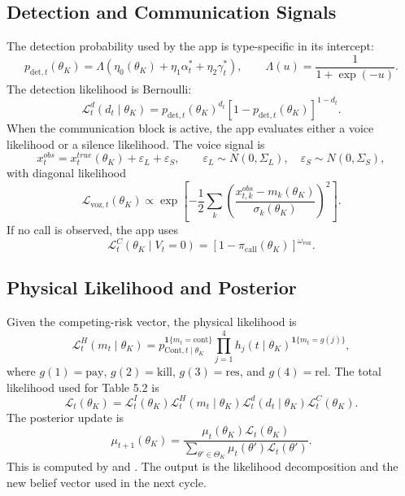 \documentclass[ecta,nameyear,final,supplement]{econsocart}
\numberwithin{equation}{section}
\newcommand{\Ind}{\mathbf{1}}
\newcommand{\ThetaK}{\Theta_K}
\newcommand{\thetak}{\theta_K}
\newcommand{\LH}{\mathcal{L}^{H}}
\newcommand{\LD}{\mathcal{L}^{d}}
\newcommand{\LC}{\mathcal{L}^{C}}
\newcommand{\LI}{\mathcal{L}^{I}}
\newcommand{\LT}{\mathcal{L}}
\begin{document}
\subsection{Detection and Communication Signals}

The detection probability used by the app is type-specific in its intercept:
\begin{equation}
p_{\mathrm{det},t}(\thetak)
=
\Lambda\!\left(\eta_0(\thetak)+\eta_1\alpha_t^\ast+\eta_2\gamma_t^\ast\right),
\qquad
\Lambda(u)=\frac{1}{1+\exp(-u)}.
\label{eq:app-detection}
\end{equation}
The detection likelihood is Bernoulli:
\begin{equation}
\LD_t(d_t\mid\thetak)
=
p_{\mathrm{det},t}(\thetak)^{d_t}
\left[1-p_{\mathrm{det},t}(\thetak)\right]^{1-d_t}.
\label{eq:app-ld}
\end{equation}
When the communication block is active, the app evaluates either a voice
likelihood or a silence likelihood. The voice signal is
\begin{equation}
x_t^{obs}
=
x_t^{true}(\thetak)+\varepsilon_L+\varepsilon_S,
\qquad
\varepsilon_L\sim N(0,\Sigma_L),\quad
\varepsilon_S\sim N(0,\Sigma_S),
\label{eq:app-voice}
\end{equation}
with diagonal likelihood
\begin{equation}
\mathcal L_{\mathrm{voz},t}(\thetak)
\propto
\exp\!\left[-\frac12
\sum_k
\left(\frac{x_{t,k}^{obs}-m_k(\thetak)}{\sigma_k(\thetak)}\right)^2
\right].
\label{eq:app-voice-likelihood}
\end{equation}
If no call is observed, the app uses
\begin{equation}
\LC_t(\thetak\mid V_t=0)
=
\left[1-\pi_{\mathrm{call}}(\thetak)\right]^{\omega_{\mathrm{voz}}}.
\label{eq:app-silence}
\end{equation}

\subsection{Physical Likelihood and Posterior}

Given the competing-risk vector, the physical likelihood is
\begin{equation}
\LH_t(m_t\mid\thetak)
=
p_{\mathrm{Cont},t\mid\thetak}^{\Ind\{m_t=\mathrm{cont}\}}
\prod_{j=1}^{4}
h_j(t\mid\thetak)^{\Ind\{m_t=g(j)\}},
\label{eq:app-lh}
\end{equation}
where $g(1)=\mathrm{pay}$, $g(2)=\mathrm{kill}$,
$g(3)=\mathrm{res}$, and $g(4)=\mathrm{rel}$. The total likelihood used for
Table 5.2 is
\begin{equation}
\LT_t(\thetak)
=
\LI_t(\thetak)\LH_t(m_t\mid\thetak)
\LD_t(d_t\mid\thetak)\LC_t(\thetak).
\label{eq:app-total-likelihood}
\end{equation}
The posterior update is
\begin{equation}
\mu_{t+1}(\thetak)
=
\frac{\mu_t(\thetak)\LT_t(\thetak)}
{\sum_{\theta'\in\ThetaK}\mu_t(\theta')\LT_t(\theta')}.
\label{eq:app-bayes}
\end{equation}
This is computed by  and
. The output is the likelihood decomposition
and the new belief vector used in the next cycle.
\end{document}
